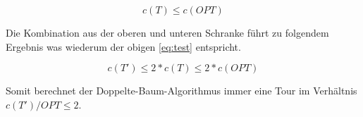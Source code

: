 \documentclass{article}
\begin{document}
\begin{equation}
c(T) \leq c(OPT)
\end{equation}

Die Kombination aus der oberen und unteren Schranke führt zu folgendem Ergebnis was wiederum der obigen \autoref{eq:test} entspricht.

\begin{equation}
c(T') \leq 2 * c(T) \leq 2 * c(OPT)
\end{equation}

Somit berechnet der Doppelte-Baum-Algorithmus immer eine Tour im Verhältnis $c(T')/OPT \leq 2$.


%
%
%
\nocite{busing2010graphen}
\nocite{jungnickel1994graphen}
\printbibliography[heading=bibnumbered,title={Literaturverzeichnis}]
\end{document}

